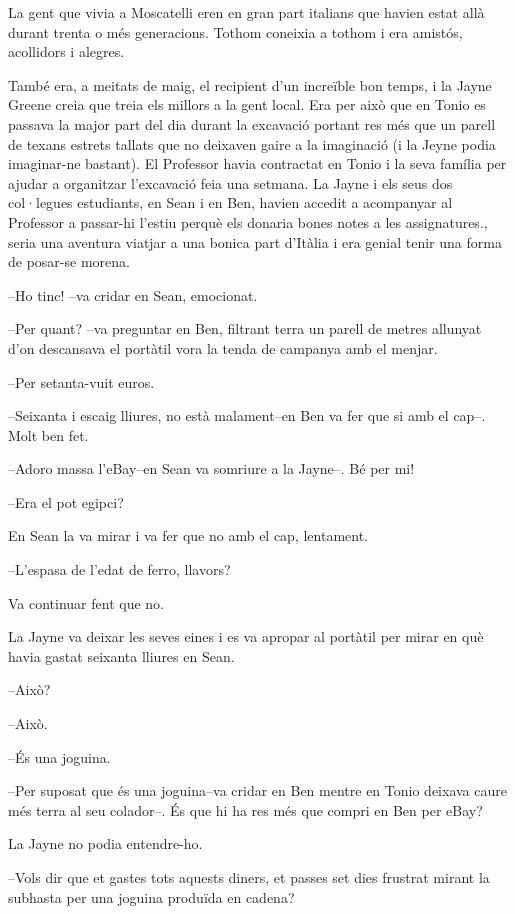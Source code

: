 La gent que vivia a Moscatelli eren en gran part italians que havien
estat allà durant trenta o més generacions. Tothom coneixia a tothom i
era amistós, acollidors i alegres.

També era, a meitats de maig, el recipient d'un increïble bon temps, i
la Jayne Greene creia que treia els millors a la gent local. Era per
això que en Tonio es passava la major part del dia durant la excavació
portant res més que un parell de texans estrets tallats que no deixaven
gaire a la imaginació (i la Jeyne podia imaginar-ne bastant). El
Professor havia contractat en Tonio i la seva família per ajudar a
organitzar l'excavació feia una setmana. La Jayne i els seus dos
col·legues estudiants, en Sean i en Ben, havien accedit a acompanyar al
Professor a passar-hi l'estiu perquè els donaria bones notes a les
assignatures., seria una aventura viatjar a una bonica part d'Itàlia i
era genial tenir una forma de posar-se morena.

--Ho tinc! --va cridar en Sean, emocionat.

--Per quant? --va preguntar en Ben, filtrant terra un parell de metres
allunyat d'on descansava el portàtil vora la tenda de campanya amb el
menjar.

--Per setanta-vuit euros.

--Seixanta i escaig lliures, no està malament--en Ben va fer que si amb
el cap--. Molt ben fet.

--Adoro massa l'eBay--en Sean va somriure a la Jayne--. Bé per mi!

--Era el pot egipci?

En Sean la va mirar i va fer que no amb el cap, lentament.

--L'espasa de l'edat de ferro, llavors?

Va continuar fent que no.

La Jayne va deixar les seves eines i es va apropar al portàtil per mirar
en què havia gastat seixanta lliures en Sean.

--Això?

--Això.

--És una joguina.

--Per suposat que és una joguina--va cridar en Ben mentre en Tonio
deixava caure més terra al seu colador--. És que hi ha res més que
compri en Ben per eBay?

La Jayne no podia entendre-ho.

--Vols dir que et gastes tots aquests diners, et passes set dies
frustrat mirant la subhasta per una joguina produïda en cadena?

